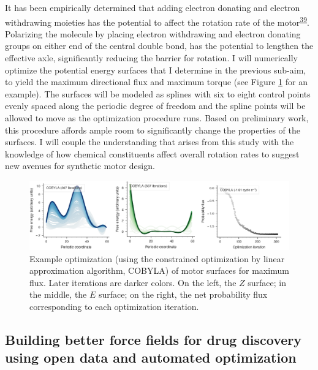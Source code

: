 \documentclass[11pt,notitlepage]{article}
\begin{document}
It has been empirically determined that adding electron donating and
electron withdrawing moieties has the potential to affect the rotation
rate of the
motor\textsuperscript{\protect\hyperlink{ref-1AzLiBVkC}{39}}. Polarizing
the molecule by placing electron withdrawing and electron donating
groups on either end of the central double bond, has the potential to
lengthen the effective axle, significantly reducing the barrier for
rotation. I will numerically optimize the potential energy surfaces that
I determine in the previous sub-aim, to yield the maximum directional
flux and maximum torque (see Figure \ref{fig:COBYLA} for an example).
The surfaces will be modeled as splines with six to eight control points
evenly spaced along the periodic degree of freedom and the spline points
will be allowed to move as the optimization procedure runs. Based on
preliminary work, this procedure affords ample room to significantly
change the properties of the surfaces. I will couple the understanding
that arises from this study with the knowledge of how chemical
constituents affect overall rotation rates to suggest new avenues for
synthetic motor design.

\begin{figure}
\centering
\includegraphics[width=1\textwidth,height=\textheight]{content/images/COBYLA.png}
\caption{Example optimization (using the constrained optimization by
linear approximation algorithm, COBYLA) of motor surfaces for maximum
flux. Later iterations are darker colors. On the left, the \(Z\)
surface; in the middle, the \(E\) surface; on the right, the net
probability flux corresponding to each optimization
iteration.\label{fig:COBYLA}}
\end{figure}

\hypertarget{building-better-force-fields-for-drug-discovery-using-open-data-and-automated-optimization}{%
\subsection{Building better force fields for drug discovery using open
data and automated
optimization}\label{building-better-force-fields-for-drug-discovery-using-open-data-and-automated-optimization}}
\end{document}
